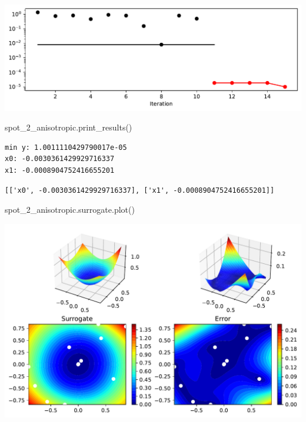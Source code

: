 \documentclass[
  letterpaper,
  DIV=11,
  numbers=noendperiod]{scrreprt}
\newenvironment{Shaded}{\begin{snugshade}}{\end{snugshade}}
\newcommand{\NormalTok}[1]{\textcolor[rgb]{0.00,0.23,0.31}{#1}}
\begin{document}
\includegraphics{009_num_spot_anisotropic_files/figure-pdf/cell-9-output-1.pdf}

\begin{Shaded}
\begin{Highlighting}[]
\NormalTok{spot\_2\_anisotropic.print\_results()}
\end{Highlighting}
\end{Shaded}

\begin{verbatim}
min y: 1.0011110429790017e-05
x0: -0.0030361429929716337
x1: -0.0008904752416655201
\end{verbatim}

\begin{verbatim}
[['x0', -0.0030361429929716337], ['x1', -0.0008904752416655201]]
\end{verbatim}

\begin{Shaded}
\begin{Highlighting}[]
\NormalTok{spot\_2\_anisotropic.surrogate.plot()}
\end{Highlighting}
\end{Shaded}

\includegraphics{009_num_spot_anisotropic_files/figure-pdf/cell-11-output-1.pdf}
\end{document}
